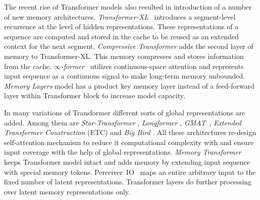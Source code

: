   The recent rise of Transformer models also resulted in introduction of a number of new memory architectures.
  \textit{Transformer-XL}~\cite{dai2019transformerxl} introduces a segment-level recurrence at the level of hidden representations. These representations of a sequence are computed and stored in the cache to be reused as an extended context for the next segment. \textit{Compressive Transformer} \cite{rae2019compressive} adds the second layer of memory to Transformer-XL. This memory compresses and stores information from the cache. \textit{$\infty$-former}~\cite{martins2021infinity} utilizes continuous-space attention and represents input sequence as a continuous signal to make long-term memory unbounded. \textit{Memory Layers} \cite{lample2019large} model has a product key memory layer instead of a feed-forward layer within Transformer block to increase model capacity.
  
  In many variations of Transformer different sorts of global representations are added. Among them are \textit{Star-Transformer} \cite{guo2019startransformer}, \textit{Longformer} \cite{beltagy2020longformer}, \textit{GMAT}~\cite{gupta2020gmat}, \textit{Extended Transformer Construction} (ETC) \cite{ainslie2020encoding} and \textit{Big Bird} \cite{zaheer2020big}. All these architectures re-design self-attention mechanism to reduce it computational complexity with and ensure input coverage with the help of global representations. \textit{Memory Transformer} \cite{burtsev2020memory-transformer} keeps Transformer model intact and adds memory by extending input sequence with special memory tokens.  Perceiver~IO~\cite{jaegle2021perceiverio} maps an entire arbitrary input to the fixed number of latent representations. Transformer layers do further processing over latent memory representations only. 
  
